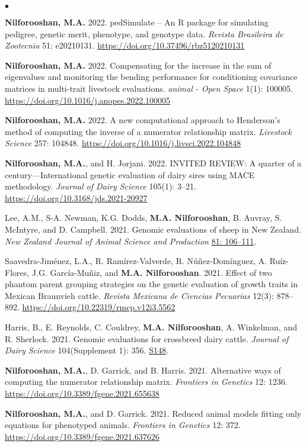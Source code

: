 \documentclass[margin,line]{res}
\newenvironment{list2}{
  \begin{list}{$\bullet$}{%
    \setlength{\itemsep}{0in}
    \setlength{\parsep}{0in} \setlength{\parskip}{0in}
    \setlength{\topsep}{0in} \setlength{\partopsep}{0in}
    \setlength{\leftmargin}{0.2in}}}
  {\end{list}}
\begin{document}
\begin{resume}
\begin{list2}
    \item {\bf Nilforooshan, M.A.} 2022. pedSimulate -- An R package for simulating pedigree, genetic merit, phenotype, and genotype data. {\em Revista Brasileira de Zootecnia} 51: e20210131. \url{https://doi.org/10.37496/rbz5120210131}
    \item {\bf Nilforooshan, M.A.} 2022. Compensating for the increase in the sum of eigenvalues and monitoring the bending performance for conditioning covariance matrices in multi-trait livestock evaluations. {\em animal - Open Space} 1(1): 100005. \url{https://doi.org/10.1016/j.anopes.2022.100005}
    \item {\bf Nilforooshan, M.A.} 2022. A new computational approach to Henderson's method of computing the inverse of a numerator relationship matrix. {\em Livestock Science} 257: 104848. \url{https://doi.org/10.1016/j.livsci.2022.104848}
    \item {\bf Nilforooshan, M.A.}, and H. Jorjani. 2022. INVITED REVIEW: A quarter of a century---International genetic evaluation of dairy sires using MACE methodology. {\em Journal of Dairy Science} 105(1): 3--21. \url{https://doi.org/10.3168/jds.2021-20927}
    \item Lee, A.M., S-A. Newman, K.G. Dodds, {\bf M.A. Nilforooshan}, B. Auvray, S. McIntyre, and D. Campbell. 2021. Genomic evaluations of sheep in New Zealand. {\em New Zealand Journal of Animal Science and Production} \href{http://www.nzsap.org/proceedings/genomic-evaluations-sheep-new-zealand}{81: 106--111}.
    \item Saavedra-Jiménez, L.A., R. Ramírez-Valverde, R. Núñez-Domínguez, A. Ruíz-Flores, J.G. García-Muñiz, and {\bf M.A. Nilforooshan}. 2021. Effect of two phantom parent grouping strategies on the genetic evaluation of growth traits in Mexican Braunvieh cattle. {\em Revista Mexicana de Ciencias Pecuarias} 12(3): 878--892. \url{https://doi.org/10.22319/rmcp.v12i3.5562}
    \item Harris, B., E. Reynolds, C. Couldrey, {\bf M.A. Nilforooshan}, A. Winkelman, and R. Sherlock. 2021. Genomic evaluations for crossbreed dairy cattle. {\em Journal of Dairy Science} 104(Supplement 1): 356. \href{https://www.adsa.org/Portals/0/SiteContent/Docs/Meetings/2021ADSA/ADSA2021_Abstracts.pdf}{S148}.
    \item {\bf Nilforooshan, M.A.}, D. Garrick, and B. Harris. 2021. Alternative ways of computing the numerator relationship matrix. {\em Frontiers in Genetics} 12: 1236. \url{https://doi.org/10.3389/fgene.2021.655638}
    \item {\bf Nilforooshan, M.A.}, and D. Garrick. 2021. Reduced animal models fitting only equations for phenotyped animals. {\em Frontiers in Genetics} 12: 372. \url{https://doi.org/10.3389/fgene.2021.637626}

\end{list2}
\end{resume}
\end{document}
